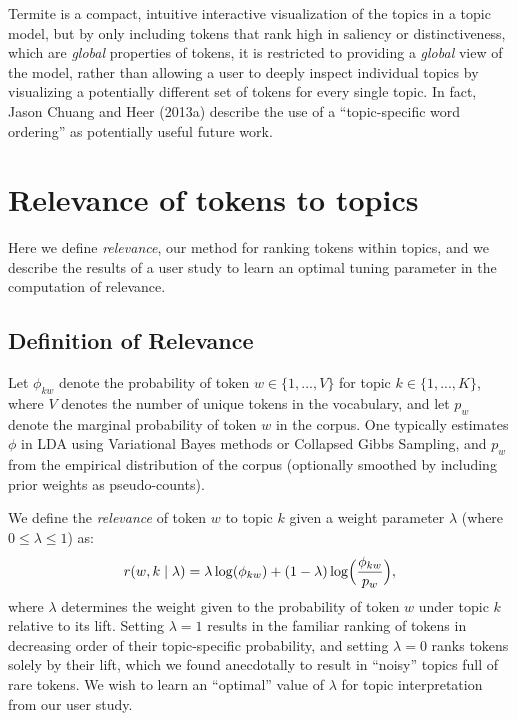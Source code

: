 \documentclass[12pt,]{isuthesis}
\begin{document}
Termite is a compact, intuitive interactive visualization of the topics
in a topic model, but by only including tokens that rank high in
saliency or distinctiveness, which are \emph{global} properties of
tokens, it is restricted to providing a \emph{global} view of the model,
rather than allowing a user to deeply inspect individual topics by
visualizing a potentially different set of tokens for every single
topic. In fact, Jason Chuang and Heer (2013a) describe the use of a
``topic-specific word ordering'' as potentially useful future work.

\section{Relevance of tokens to topics}

Here we define \emph{relevance}, our method for ranking tokens within
topics, and we describe the results of a user study to learn an optimal
tuning parameter in the computation of relevance.

\subsection{Definition of Relevance}\label{section:relevance}

Let \(\phi_{kw}\) denote the probability of token
\(w \in \{1, ..., V\}\) for topic \(k\in \{1, ..., K\}\), where \(V\)
denotes the number of unique tokens in the vocabulary, and let \(p_w\)
denote the marginal probability of token \(w\) in the corpus. One
typically estimates \(\phi\) in LDA using Variational Bayes methods or
Collapsed Gibbs Sampling, and \(p_w\) from the empirical distribution of
the corpus (optionally smoothed by including prior weights as
pseudo-counts).

We define the \emph{relevance} of token \(w\) to topic \(k\) given a
weight parameter \(\lambda\) (where \(0 \leq \lambda \leq 1\)) as: \[
r(w, k \mid \lambda) = \lambda \log(\phi_{kw}) + (1 - \lambda)\log\Bigl(\frac{\phi_{kw}}{p_w}\Bigr),
\] where \(\lambda\) determines the weight given to the probability of
token \(w\) under topic \(k\) relative to its lift. Setting
\(\lambda = 1\) results in the familiar ranking of tokens in decreasing
order of their topic-specific probability, and setting \(\lambda = 0\)
ranks tokens solely by their lift, which we found anecdotally to result
in ``noisy'' topics full of rare tokens. We wish to learn an ``optimal''
value of \(\lambda\) for topic interpretation from our user study.
\end{document}
